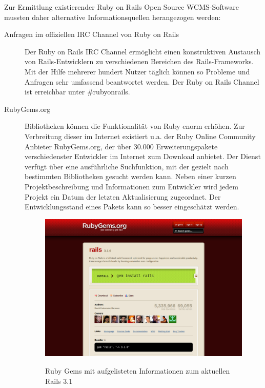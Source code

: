 Zur Ermittlung existierender Ruby on Rails Open Source WCMS-Software mussten daher alternative Informationsquellen herangezogen werden:
\begin{description}
\item[Anfragen im offiziellen IRC Channel von Ruby on Rails]
Der Ruby on Rails IRC Channel ermöglicht einen konstruktiven Austausch von Rails-Entwicklern zu verschiedenen Bereichen des Rails-Frameworks. Mit der Hilfe mehrerer hundert Nutzer täglich können so Probleme und Anfragen sehr umfassend beantwortet werden. Der Ruby on Rails Channel ist erreichbar unter \#rubyonrails.
\item[RubyGems.org]
Bibliotheken können die Funktionalität von Ruby enorm erhöhen. Zur Verbreitung dieser im Internet existiert u.a. der Ruby Online Community Anbieter RubyGems.org, der über 30.000 Erweiterungspakete verschiedenster Entwickler im Internet zum Download anbietet.
Der Dienst verfügt über eine ausführliche Suchfunktion, mit der gezielt nach bestimmten Bibliotheken gesucht werden kann. Neben einer kurzen Projektbeschreibung und Informationen zum Entwickler wird jedem Projekt ein Datum der letzten Aktualisierung zugeordnet. Der Entwicklungsstand eines Pakets kann so besser eingeschätzt werden.
\begin{figure}
\begin{center}
\label{fig.backendalchemy}
\includegraphics[scale=0.3]{images/analyse/rubygems/railsonrubygems.png}
\caption{Ruby Gems mit aufgelisteten Informationen zum aktuellen Rails 3.1}
\end{center}
\end{figure}
\end{description}


